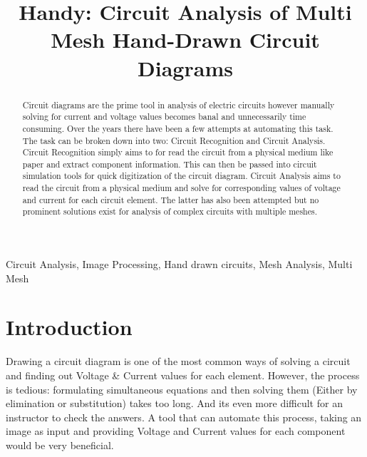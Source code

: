 \documentclass[conference]{IEEEtran}
\begin{document}
\title{Handy: Circuit Analysis of Multi Mesh Hand-Drawn Circuit Diagrams}

\author{
\and
{}
}

\maketitle

\begin{abstract}
Circuit diagrams are the prime tool in analysis of electric circuits however manually solving for current and voltage values becomes banal and unnecessarily time consuming. Over the years there have been a few attempts at automating this task. The task can be broken down into two: Circuit Recognition and Circuit Analysis. Circuit Recognition simply aims to for read the circuit from a physical medium like paper and extract component information. This can then be passed into circuit simulation tools for quick digitization of the circuit diagram. Circuit Analysis aims to read the circuit from a physical medium and solve for corresponding values of voltage and current for each circuit element. The latter has also been attempted but no prominent solutions exist for analysis of complex circuits with multiple meshes. 
\end{abstract}

\begin{IEEEkeywords}
Circuit Analysis, Image Processing, Hand drawn circuits, Mesh Analysis, Multi Mesh
\end{IEEEkeywords}

\section{\textbf{Introduction}}
Drawing a circuit diagram is one of the most common ways of solving a circuit and finding out Voltage \& Current values for each element. However, the process is tedious: formulating simultaneous equations and then solving them (Either by elimination or substitution) takes too long. And its even more difficult for an instructor to check the answers. A tool that can automate this process, taking an image as input and providing Voltage and Current values for each component would be very beneficial.
\end{document}
